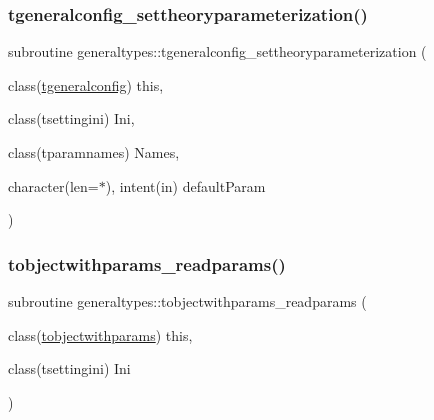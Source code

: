 \subsubsection{\texorpdfstring{tgeneralconfig\+\_\+settheoryparameterization()}{tgeneralconfig\_settheoryparameterization()}}
{\footnotesize\ttfamily subroutine generaltypes\+::tgeneralconfig\+\_\+settheoryparameterization (\begin{DoxyParamCaption}\item[{class(\mbox{\hyperlink{structgeneraltypes_1_1tgeneralconfig}{tgeneralconfig}})}]{this,  }\item[{class(tsettingini)}]{Ini,  }\item[{class(tparamnames)}]{Names,  }\item[{character(len=$\ast$), intent(in)}]{default\+Param }\end{DoxyParamCaption})\hspace{0.3cm}{\ttfamily [private]}}

\mbox{\label{namespacegeneraltypes_aebd5d13abc4092b06e3e6164880ee11a}} 
\subsubsection{\texorpdfstring{tobjectwithparams\+\_\+readparams()}{tobjectwithparams\_readparams()}}
{\footnotesize\ttfamily subroutine generaltypes\+::tobjectwithparams\+\_\+readparams (\begin{DoxyParamCaption}\item[{class(\mbox{\hyperlink{structgeneraltypes_1_1tobjectwithparams}{tobjectwithparams}})}]{this,  }\item[{class(tsettingini)}]{Ini }\end{DoxyParamCaption})\hspace{0.3cm}{\ttfamily [private]}}

\mbox{\label{namespacegeneraltypes_afd268eae09678643a72d0b3ed8da568a}} 
